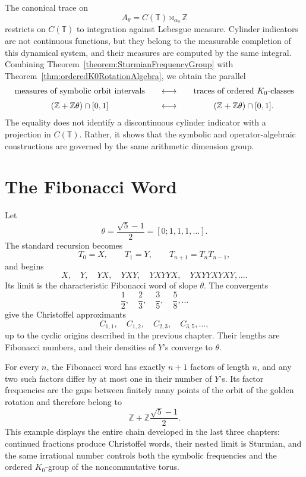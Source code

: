 \documentclass{book}
\begin{document}
The canonical trace on
\[
  A_\theta=C(\mathbb T)\rtimes_{\alpha_\theta}\mathbb Z
\] 
restricts on \(C(\mathbb T)\) to integration against Lebesgue measure.
Cylinder indicators are not continuous functions, but they belong to the
measurable completion of this dynamical system, and their measures are
computed by the same integral.  Combining
Theorem~\ref{theorem:SturmianFrequencyGroup} with
Theorem~\ref{thm:orderedK0RotationAlgebra}, we obtain the parallel
\[
  \begin{array}{c@{\qquad\longleftrightarrow\qquad}c}
    \text{measures of symbolic orbit intervals}
      &\text{traces of ordered \(K_0\)-classes}\\[2mm]
    (\mathbb Z+\mathbb Z\theta)\cap[0,1]
      &(\mathbb Z+\mathbb Z\theta)\cap[0,1].
  \end{array}
\]
The equality does not identify a discontinuous cylinder indicator with a
projection in \(C(\mathbb T)\).  Rather, it shows that the symbolic and
operator-algebraic constructions are governed by the same arithmetic
dimension group.

\section{The Fibonacci Word}

Let
\[
  \theta=\frac{\sqrt5-1}{2}=[0;1,1,1,\ldots].
\]
The standard recursion becomes
\[
  T_0=X,\qquad T_1=Y,\qquad T_{n+1}=T_nT_{n-1},
\]
and begins
\[
  X,\quad Y,\quad YX,\quad YXY,\quad YXYYX,
  \quad YXYYXYXY,\ldots.
\]
Its limit is the characteristic Fibonacci word of slope \(\theta\).
The convergents
\[
  \frac12,\quad\frac23,\quad\frac35,\quad\frac58,\ldots
\]
give the Christoffel approximants
\[
  C_{1,1},\quad C_{1,2},\quad C_{2,3},\quad C_{3,5},\ldots,
\]
up to the cyclic origins described in the previous chapter.  Their lengths
are Fibonacci numbers, and their densities of \(Y\)'s converge to
\(\theta\).

For every \(n\), the Fibonacci word has exactly \(n+1\) factors of length
\(n\), and any two such factors differ by at most one in their number of
\(Y\)'s.  Its factor frequencies are the gaps between finitely many points
of the orbit of the golden rotation and therefore belong to
\[
  \mathbb Z+\mathbb Z\frac{\sqrt5-1}{2}.
\]
This example displays the entire chain developed in the last three
chapters: continued fractions produce Christoffel words, their nested limit
is Sturmian, and the same irrational number controls both the symbolic
frequencies and the ordered \(K_0\)-group of the noncommutative torus.
\end{document}
